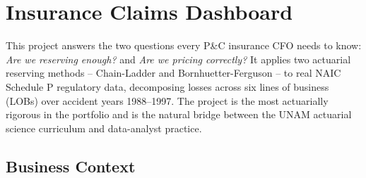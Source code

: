 
\chapter{Insurance Claims Dashboard}
\label{ch:insurance}

\begin{keyinsight}
This project answers the two questions every P\&C insurance CFO needs to know:
\emph{Are we reserving enough?} and \emph{Are we pricing correctly?}
It applies two actuarial reserving methods -- Chain-Ladder and
Bornhuetter-Ferguson -- to real NAIC Schedule P regulatory data,
decomposing losses across six lines of business (LOBs) over accident years
1988--1997.  The project is the most actuarially rigorous in the portfolio
and is the natural bridge between the UNAM actuarial science curriculum and
data-analyst practice.
\end{keyinsight}

\section{Business Context}
\label{sec:ins-context}


